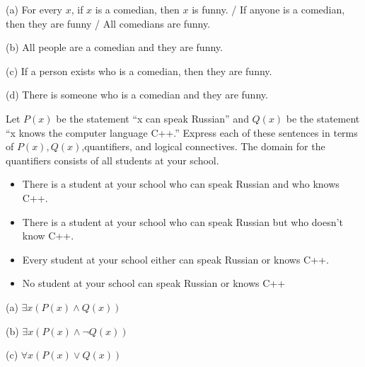 \documentclass[addpoints]{exam}
\newenvironment{problem}[2][Problem]{\begin{trivlist}
    \item[\hskip \labelsep {\bfseries #1}\hskip \labelsep {\bfseries #2.}]}{\end{trivlist}}
\begin{document}
\begin{sloppypar}
\begin{questions}
    \question
    \begin{solution}
        
        (a) For every $x$, if $x$ is a comedian, then $x$ is funny. / If anyone is a comedian, then they are funny / All comedians are funny.

        (b) All people are a comedian and they are funny.

        (c) If a person exists who is a comedian, then they are funny.

        (d) There is someone who is a comedian and they are funny.
    \end{solution}
\end{questions}

\begin{problem}{3}
Let $P(x)$ be the statement ``x can speak Russian'' and $Q(x)$ be the statement ``x knows the computer language C++.''
Express each of these sentences in terms of $P(x),Q(x)$,quantifiers, and logical connectives. The domain for the quantifiers consists of all students at your school.
\begin{itemize}
    \item [(a)] There is a student at your school who can speak Russian and who knows C++.
    \item [(b)] There is a student at your school who can speak Russian but who doesn’t know C++.
    \item [(c)] Every student at your school either can speak Russian or knows C++.
    \item [(d)] No student at your school can speak Russian or knows C++
\end{itemize}

\end{problem}

\begin{questions}
    \question
    \begin{solution}
        
        (a) $ \exists x (P(x) \land Q(x)) $ 

        (b) $ \exists x (P(x) \land \neg Q(x)) $

        (c) $ \forall x (P(x) \lor Q(x)) $ 


\end{solution}
\end{questions}
\end{sloppypar}
\end{document}
